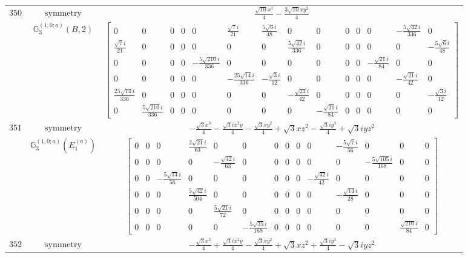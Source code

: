 \documentclass[fleqn,8pt,landscape]{jsarticle}
\begin{document}
\begin{longtable}{ccc}
$ 350 $ & $ \text{symmetry} $ & $ \frac{\sqrt{10} x^{3}}{4} - \frac{3 \sqrt{10} x y^{2}}{4} $ \\
$  $ & $ \mathbb{G}_{3}^{(1,0;a)}(B,2) $ & $ \begin{bmatrix} 0 & 0 & 0 & 0 & 0 & \frac{\sqrt{7} i}{21} & \frac{5 \sqrt{6} i}{48} & 0 & 0 & 0 & 0 & 0 & - \frac{5 \sqrt{42} i}{336} & 0 \\ \frac{\sqrt{7} i}{21} & 0 & 0 & 0 & 0 & 0 & 0 & \frac{5 \sqrt{42} i}{336} & 0 & 0 & 0 & 0 & 0 & - \frac{5 \sqrt{6} i}{48} \\ 0 & 0 & 0 & 0 & - \frac{5 \sqrt{210} i}{336} & 0 & 0 & 0 & 0 & 0 & 0 & - \frac{\sqrt{21} i}{84} & 0 & 0 \\ 0 & 0 & 0 & 0 & 0 & - \frac{25 \sqrt{14} i}{336} & - \frac{\sqrt{3} i}{12} & 0 & 0 & 0 & 0 & 0 & - \frac{\sqrt{21} i}{42} & 0 \\ \frac{25 \sqrt{14} i}{336} & 0 & 0 & 0 & 0 & 0 & 0 & - \frac{\sqrt{21} i}{42} & 0 & 0 & 0 & 0 & 0 & - \frac{\sqrt{3} i}{12} \\ 0 & \frac{5 \sqrt{210} i}{336} & 0 & 0 & 0 & 0 & 0 & 0 & - \frac{\sqrt{21} i}{84} & 0 & 0 & 0 & 0 & 0 \end{bmatrix} $ \\ \hline
$ 351 $ & $ \text{symmetry} $ & $ - \frac{\sqrt{3} x^{3}}{4} - \frac{\sqrt{3} i x^{2} y}{4} - \frac{\sqrt{3} x y^{2}}{4} + \sqrt{3} x z^{2} - \frac{\sqrt{3} i y^{3}}{4} + \sqrt{3} i y z^{2} $ \\
$  $ & $ \mathbb{G}_{3}^{(1,0;a)}(E_{1}^{(a)}) $ & $ \begin{bmatrix} 0 & 0 & 0 & \frac{2 \sqrt{21} i}{63} & 0 & 0 & 0 & 0 & 0 & 0 & - \frac{5 \sqrt{7} i}{56} & 0 & 0 & 0 \\ 0 & 0 & 0 & 0 & - \frac{\sqrt{42} i}{63} & 0 & 0 & 0 & 0 & 0 & 0 & - \frac{5 \sqrt{105} i}{168} & 0 & 0 \\ 0 & 0 & - \frac{5 \sqrt{14} i}{56} & 0 & 0 & 0 & 0 & 0 & 0 & - \frac{\sqrt{42} i}{42} & 0 & 0 & 0 & 0 \\ 0 & 0 & 0 & \frac{5 \sqrt{42} i}{504} & 0 & 0 & 0 & 0 & 0 & 0 & - \frac{\sqrt{14} i}{28} & 0 & 0 & 0 \\ 0 & 0 & 0 & 0 & \frac{5 \sqrt{21} i}{72} & 0 & 0 & 0 & 0 & 0 & 0 & 0 & 0 & 0 \\ 0 & 0 & 0 & 0 & 0 & - \frac{5 \sqrt{35} i}{168} & 0 & 0 & 0 & 0 & 0 & 0 & \frac{\sqrt{210} i}{84} & 0 \end{bmatrix} $ \\ \hline
$ 352 $ & $ \text{symmetry} $ & $ - \frac{\sqrt{3} x^{3}}{4} + \frac{\sqrt{3} i x^{2} y}{4} - \frac{\sqrt{3} x y^{2}}{4} + \sqrt{3} x z^{2} + \frac{\sqrt{3} i y^{3}}{4} - \sqrt{3} i y z^{2} $ \\

\end{longtable}
\end{document}
